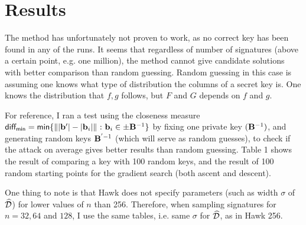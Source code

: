 \section{Results}

The method has unfortunately not proven to work, as no correct key has been found in any of the runs. It seems that regardless of number of signatures (above a certain point, e.g. one million), the method cannot give candidate solutions with
better comparison than random guessing. Random guessing in this case is assuming one knows what type of distribution the columns of a secret key is. One knows the distribution that $f, g$ follows, but $F$ and $G$ depends on $f$ and $g$.

For reference, I ran a test using the closeness measure $ \mathsf{diff_{min}} = \mathsf{min} \{\lVert \lvert \vec{b}' \rvert - \lvert \vec{b}_i \rvert \rVert \ \mathbf{:} \ \vec{b}_i \in \pm \mat{B}^{-1}\}$ by fixing one private key $(\mathbf{B}^{-1})$, 
and generating random keys $\mathbf{B}^{'-1}$ (which will serve as random guesses), to check if the attack on average gives better results than random
guessing. Table 1 shows the result of comparing a key with 100 random keys, and the result of 100 random starting points for the gradient search (both ascent and descent).

One thing to note is that Hawk does not specify parameters (such as width $\sigma$ of $\widehat{\mathcal{D}}$) for lower values of $n$ than 256. Therefore, when sampling signatures for $n=32, 64$ and $128$, I use the same tables, i.e. same $\sigma$ for $\widehat{\mathcal{D}}$, as in Hawk 256.

